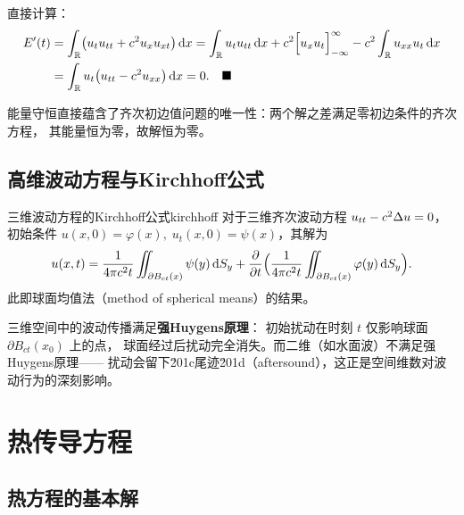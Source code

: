 \documentclass[11pt,a4paper,openany,oneside]{ctexbook}
\begin{document}
\begin{proofbox}
  直接计算：
  \begin{align*}
    E'(t) &= \int_{\mathbb{R}} \bigl(u_{t}u_{tt} + c^{2}u_{x}u_{xt}\bigr)\,\mathrm{d} x
           = \int_{\mathbb{R}} u_{t}u_{tt}\,\mathrm{d} x + c^{2}\Bigl[u_{x}u_{t}\Bigr]_{-\infty}^{\infty}
             - c^{2}\int_{\mathbb{R}} u_{xx}u_{t}\,\mathrm{d} x \\
          &= \int_{\mathbb{R}} u_{t}\bigl(u_{tt}-c^{2}u_{xx}\bigr)\,\mathrm{d} x = 0. \quad\blacksquare
  \end{align*}
\end{proofbox}

能量守恒直接蕴含了齐次初边值问题的唯一性：两个解之差满足零初边条件的齐次方程，
其能量恒为零，故解恒为零。

\section{高维波动方程与Kirchhoff公式}

\begin{theorem}{三维波动方程的Kirchhoff公式}{kirchhoff}
  对于三维齐次波动方程 $u_{tt}-c^{2}\Delta u=0$，
  初始条件 $u(x,0)=\varphi(x),\; u_{t}(x,0)=\psi(x)$，其解为
  \begin{align*}
    u(x,t) = \frac{1}{4\pi c^{2}t}\iint_{\partial B_{ct}(x)} \psi(y)\,\mathrm{d} S_{y}
            + \frac{\partial }{\partial t}\Bigl(\frac{1}{4\pi c^{2}t}\iint_{\partial B_{ct}(x)} \varphi(y)\,\mathrm{d} S_{y}\Bigr).
  \end{align*}
  此即球面均值法（method of spherical means）的结果。
\end{theorem}

\begin{remarkbox}
  三维空间中的波动传播满足\textbf{强Huygens原理}：
  初始扰动在时刻 $t$ 仅影响球面 $\partial B_{ct}(x_{0})$ 上的点，
  球面经过后扰动完全消失。而二维（如水面波）不满足强Huygens原理——
  扰动会留下\u201c尾迹\u201d（aftersound），这正是空间维数对波动行为的深刻影响。
\end{remarkbox}

\newpage

\chapter{热传导方程}

\section{热方程的基本解}
\end{document}
